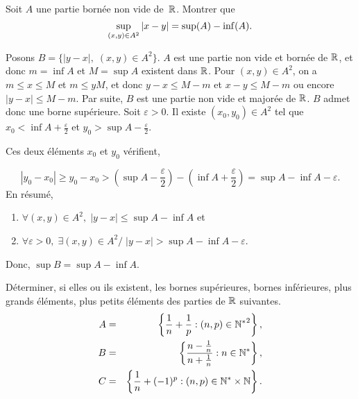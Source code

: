 \documentclass{magnolia}
\begin{document}
Soit $A$ une partie bornée non vide de~$\mathbb{R}$. Montrer que 
\[\sup_{\left(x,y\right)\in A^2}\left|x-y\right|=\sup(A)-\inf(A).\]

\begin{sol}
Posons $B=\{|y-x|,\;(x,y)\in A^2\}$.
$A$ est une partie non vide et bornée de $\mathbb{R}$, et donc $m=\inf A$ et $M=\sup A$ existent dans $\mathbb{R}$.
Pour $(x,y)\in A^2$, on a $m\leq x\leq M$ et $m\leq y M$, et donc $y-x\leq M-m$ et $x-y\leq M-m$ ou encore $|y-x|\leq M-m$.
Par suite, $B$ est une partie non vide et majorée de $\mathbb{R}$. $B$ admet donc une borne supérieure.
Soit $\varepsilon>0$. Il existe $(x_0,y_0)\in A^2$ tel que $x_0<\inf A+\frac{\varepsilon}{2}$ et $y_0>\sup A-\frac{\varepsilon}{2}$.

Ces deux éléments $x_0$ et $y_0$ vérifient, 

$$|y_0-x_0|\geq y_0-x_0>\left(\sup A-\frac{\varepsilon}{2}\right)-\left(\inf A+\frac{\varepsilon}{2}\right)=\sup A-\inf A-\varepsilon.$$
En résumé, 
\begin{enumerate}
 \item  $\forall(x,y)\in A^2,\;|y-x|\leq\sup A-\inf A$ et  
 \item  $\forall\varepsilon>0,\;\exists(x,y)\in A^2/\;|y-x|>\sup A-\inf A-\varepsilon$.
\end{enumerate}
Donc, $\sup B=\sup A-\inf A$.

\end{sol}


Déterminer, si
elles ou ils existent, les bornes supérieures, bornes inférieures, plus grands
éléments, plus petits éléments des parties de $\mathbb{R}$ suivantes.
\begin{eqnarray*}
A&=&\left\{\frac{1}{n}+\frac{1}{p} : \left(n,p\right)\in{\mathbb{N}^*}^2\right\},\\
B&=&\left\{\frac{n-\frac{1}{n}}{n+\frac{1}{n}} : n\in{\mathbb{N}^*}\right\},\\
C&=&\left\{\frac{1}{n}+(-1)^p : \left(n,p\right)\in{\mathbb{N}^*}\times\mathbb{N}\right\}.
\end{eqnarray*}
\end{document}
